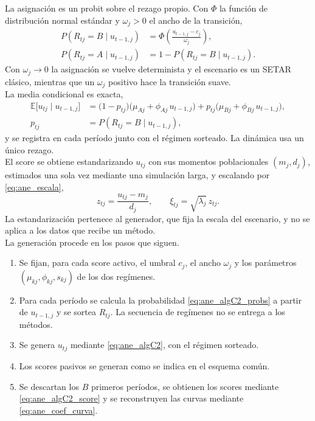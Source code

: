 La asignación es un probit sobre el rezago propio. Con $\Phi$ la función de distribución normal estándar y $\omega_j>0$ el ancho de la transición,
\begin{align}
    P(R_{tj}=B\mid u_{t-1,j}) &= \Phi\!\left(\frac{u_{t-1,j}-c_j}{\omega_j}\right), \label{eq:ane_algC2_probs}\\
    P(R_{tj}=A\mid u_{t-1,j}) &= 1-P(R_{tj}=B\mid u_{t-1,j}). \nonumber
\end{align}
Con $\omega_j\to0$ la asignación se vuelve determinista y el escenario es un SETAR clásico, mientras que un $\omega_j$ positivo hace la transición suave.\\

La media condicional es exacta,
\begin{align}
    \mathbb{E}\bigl[u_{tj}\mid u_{t-1,j}\bigr]
    &=\bigl(1-p_{tj}\bigr)\bigl(\mu_{Aj}+\phi_{Aj}\,u_{t-1,j}\bigr)+p_{tj}\bigl(\mu_{Bj}+\phi_{Bj}\,u_{t-1,j}\bigr), \label{eq:ane_algC2_oraculo}\\
    p_{tj}&=P(R_{tj}=B\mid u_{t-1,j}), \nonumber
\end{align}
y se registra en cada período junto con el régimen sorteado. La dinámica usa un único rezago.\\

El score se obtiene estandarizando $u_{tj}$ con sus momentos poblacionales $(m_j,d_j)$, estimados una sola vez mediante una simulación larga, y escalando por \eqref{eq:ane_escala},
\begin{equation}
\label{eq:ane_algC2_score}
z_{tj}=\frac{u_{tj}-m_j}{d_j},
\qquad
\xi_{tj}=\sqrt{\lambda_j}\,z_{tj}.
\end{equation}
La estandarización pertenece al generador, que fija la escala del escenario, y no se aplica a los datos que recibe un método.\\

La generación procede en los pasos que siguen.
\begin{enumerate}
    \item Se fijan, para cada score activo, el umbral $c_j$, el ancho $\omega_j$ y los parámetros $(\mu_{kj},\phi_{kj},s_{kj})$ de los dos regímenes.

    \item Para cada período se calcula la probabilidad \eqref{eq:ane_algC2_probs} a partir de $u_{t-1,j}$ y se sortea $R_{tj}$. La secuencia de regímenes no se entrega a los métodos.

    \item Se genera $u_{tj}$ mediante \eqref{eq:ane_algC2}, con el régimen sorteado.

    \item Los scores pasivos se generan como se indica en el esquema común.

    \item Se descartan los $B$ primeros períodos, se obtienen los scores mediante \eqref{eq:ane_algC2_score} y se reconstruyen las curvas mediante \eqref{eq:ane_coef_curva}.
\end{enumerate}

